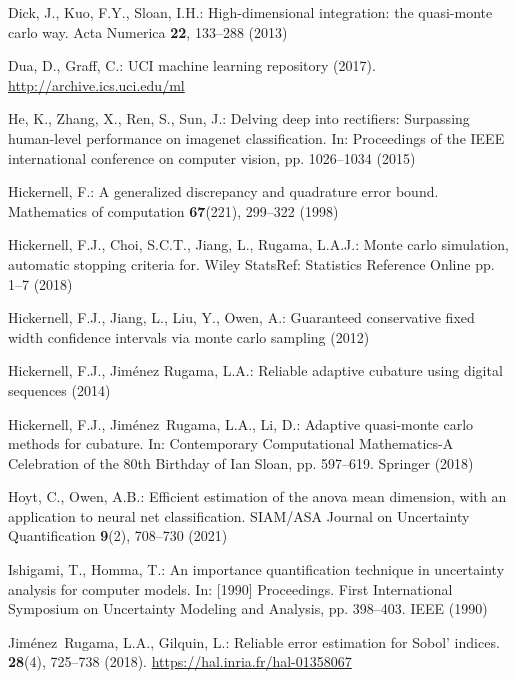 \documentclass[graybox]{svmult}
\begin{document}
\begin{thebibliography}{10}
Dick, J., Kuo, F.Y., Sloan, I.H.: High-dimensional integration: the quasi-monte
  carlo way.
\newblock Acta Numerica \textbf{22}, 133--288 (2013)

Dua, D., Graff, C.: {UCI} machine learning repository (2017).
\newblock \urlprefix\url{http://archive.ics.uci.edu/ml}

He, K., Zhang, X., Ren, S., Sun, J.: Delving deep into rectifiers: Surpassing
  human-level performance on imagenet classification.
\newblock In: Proceedings of the IEEE international conference on computer
  vision, pp. 1026--1034 (2015)

Hickernell, F.: A generalized discrepancy and quadrature error bound.
\newblock Mathematics of computation \textbf{67}(221), 299--322 (1998)

Hickernell, F.J., Choi, S.C.T., Jiang, L., Rugama, L.A.J.: Monte carlo
  simulation, automatic stopping criteria for.
\newblock Wiley StatsRef: Statistics Reference Online pp. 1--7 (2018)

Hickernell, F.J., Jiang, L., Liu, Y., Owen, A.: Guaranteed conservative fixed
  width confidence intervals via monte carlo sampling (2012)

Hickernell, F.J., {Jim\'enez Rugama}, L.A.: Reliable adaptive cubature using
  digital sequences (2014)

Hickernell, F.J., Jim\'{e}nez~Rugama, L.A., Li, D.: Adaptive quasi-monte carlo
  methods for cubature.
\newblock In: Contemporary Computational Mathematics-A Celebration of the 80th
  Birthday of Ian Sloan, pp. 597--619. Springer (2018)

Hoyt, C., Owen, A.B.: Efficient estimation of the anova mean dimension, with an
  application to neural net classification.
\newblock SIAM/ASA Journal on Uncertainty Quantification \textbf{9}(2),
  708--730 (2021)

Ishigami, T., Homma, T.: An importance quantification technique in uncertainty
  analysis for computer models.
\newblock In: [1990] Proceedings. First International Symposium on Uncertainty
  Modeling and Analysis, pp. 398--403. IEEE (1990)

Jim{\'e}nez~Rugama, L.A., Gilquin, L.: {Reliable error estimation for Sobol'
  indices}.
 \textbf{28}(4), 725--738 (2018).
\newblock \urlprefix\url{https://hal.inria.fr/hal-01358067}


\end{thebibliography}
\end{document}
